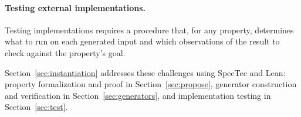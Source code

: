 \paragraph{Testing external implementations.}
\label{sec:implementation-procedure}
Testing implementations requires a procedure that, for any property, determines what to run on each generated input and which observations of the result to check against the property's goal.

Section~\ref{sec:instantiation} addresses these challenges using SpecTec and Lean: property formalization and proof in Section~\ref{sec:propose}, generator construction and verification in Section~\ref{sec:generators}, and implementation testing in Section~\ref{sec:test}.
